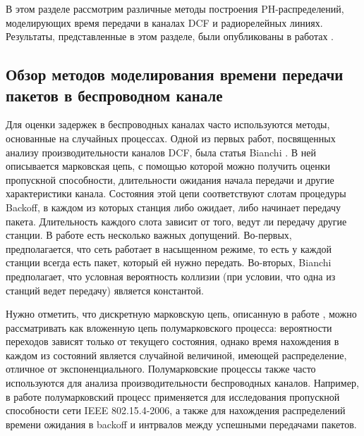 В этом разделе рассмотрим различные методы построения PH-распределений, моделирующих время передачи в каналах DCF и радиорелейных линиях. Результаты, представленные в этом разделе, были опубликованы в работах \cite{QS_ITMM2019, QS_ICAAPSP2020}.



\subsection{Обзор методов моделирования времени передачи пакетов в беспроводном канале}
Для оценки задержек в беспроводных каналах часто используются методы, основанные на случайных процессах. Одной из первых работ, посвященных анализу производительности каналов DCF, была статья Bianchi \cite{Bianchi2000}. В ней описывается марковская цепь, с помощью которой можно получить оценки пропускной способности, длительности ожидания начала передачи и другие характеристики канала. Состояния этой цепи соответствуют слотам процедуры Backoff, в каждом из которых станция либо ожидает, либо начинает передачу пакета. Длительность каждого слота зависит от того, ведут ли передачу другие станции. В работе \cite{Bianchi2000} есть несколько важных допущений. Во-первых, предполагается, что сеть работает в насыщенном режиме, то есть у каждой станции всегда есть пакет, который ей нужно передать. Во-вторых, Bianchi предполагает, что условная вероятность коллизии (при условии, что одна из станций ведет передачу) является константой.

Нужно отметить, что дискретную марковскую цепь, описанную в работе \cite{Bianchi2000}, можно рассматривать как вложенную цепь полумарковского процесса: вероятности переходов зависят только от текущего состояния, однако время нахождения в каждом из состояний является случайной величиной, имеющей распределение, отличное от экспоненциального. Полумарковские процессы также часто используются для анализа производительности беспроводных каналов. Например, в работе \cite{Lauwens2010} полумарковский процесс применяется для исследования пропускной способности сети  IEEE 802.15.4-2006, а также для нахождения распределений времени ожидания в backoff и интрвалов между успешными передачами пакетов.

